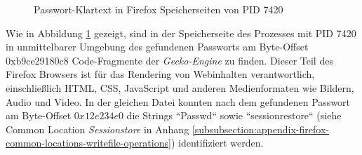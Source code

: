 \begin{figure}[h!]
	\centering
	\hfill
	\caption{Passwort-Klartext in Firefox Speicherseiten von PID 7420}
	\label{img:firefox-pw-offset-pid-7420}  
\end{figure}
Wie in Abbildung \ref{img:firefox-pw-offset-pid-7420} gezeigt, sind in der Speicherseite des Prozesses mit PID 7420 in unmittelbarer Umgebung des gefundenen Passworts am Byte-Offset 0xb9ce29180c8 Code-Fragmente der \textit{Gecko-Engine} zu finden. Dieser Teil des Firefox Browsers ist für das Rendering von Webinhalten verantwortlich, einschließlich HTML, CSS, JavaScript und anderen Medienformaten wie Bildern, Audio und Video. \cite{MozillaWiki.05.06.2023}
In der gleichen Datei konnten nach dem gefundenen Passwort am Byte-Offset $0x12e234e0$ die Strings ``Passwd`` sowie ``sessionrestore`` (siehe Common Location \textit{Sessionstore} in Anhang \ref{subsubsection:appendix-firefox-common-locations-writefile-operations}) identifiziert werden. 

